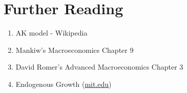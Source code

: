 \documentclass[10pt]{article}
\begin{document}
\section*{Further Reading}
\begin{enumerate}
  \item AK model - Wikipedia
  \item Mankiw's Macroeconomics Chapter 9
  \item David Romer's Advanced Macroeconomics Chapter 3
  \item Endogenous Growth (\href{http://mit.edu}{mit.edu})
\end{enumerate}
\end{document}
